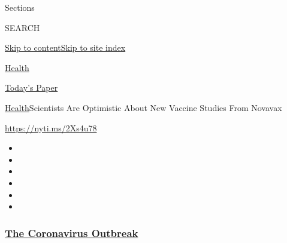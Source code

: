 Sections

SEARCH

\protect\hyperlink{site-content}{Skip to
content}\protect\hyperlink{site-index}{Skip to site index}

\href{https://www.nytimes3xbfgragh.onion/section/health}{Health}

\href{https://myaccount.nytimes3xbfgragh.onion/auth/login?response_type=cookie\&client_id=vi}{}

\href{https://www.nytimes3xbfgragh.onion/section/todayspaper}{Today's
Paper}

\href{/section/health}{Health}\textbar{}Scientists Are Optimistic About
New Vaccine Studies From Novavax

\url{https://nyti.ms/2Xs4u78}

\begin{itemize}
\item
\item
\item
\item
\item
\item
\end{itemize}

\hypertarget{the-coronavirus-outbreak}{%
\subsubsection{\texorpdfstring{\href{https://www.nytimes3xbfgragh.onion/news-event/coronavirus?name=styln-coronavirus-national\&region=TOP_BANNER\&block=storyline_menu_recirc\&action=click\&pgtype=Article\&impression_id=4ca11790-efbb-11ea-99e8-0d08d99b0aa0\&variant=undefined}{The
Coronavirus
Outbreak}}{The Coronavirus Outbreak}}\label{the-coronavirus-outbreak}}

